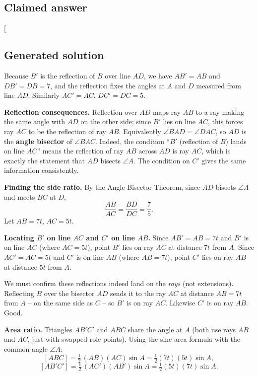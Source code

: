 \documentclass[
  11pt,
  letterpaper,
]{article}
\begin{document}
\subsection{Claimed answer}\label{claimed-answer-15}

{[}\boxed{649}{]}

\subsection{Generated solution}\label{generated-solution-15}

Because \(B'\) is the reflection of \(B\) over line \(AD\), we have
\(AB' = AB\) and \(DB' = DB = 7\), and the reflection fixes the angles
at \(A\) and \(D\) measured from line \(AD\). Similarly \(AC' = AC\),
\(DC' = DC = 5\).

\textbf{Reflection consequences.} Reflection over \(AD\) maps ray \(AB\)
to a ray making the same angle with \(AD\) on the other side; since
\(B'\) lies on line \(AC\), this forces ray \(AC\) to be the reflection
of ray \(AB\). Equivalently \(\angle BAD = \angle DAC\), so \(AD\) is
the \textbf{angle bisector} of \(\angle BAC\). Indeed, the condition
``\(B'\) (reflection of \(B\)) lands on line \(AC\)'' means the
reflection of ray \(AB\) across \(AD\) is ray \(AC\), which is exactly
the statement that \(AD\) bisects \(\angle A\). The condition on \(C'\)
gives the same information consistently.

\textbf{Finding the side ratio.} By the Angle Bisector Theorem, since
\(AD\) bisects \(\angle A\) and meets \(BC\) at \(D\),
\[\frac{AB}{AC} = \frac{BD}{DC} = \frac{7}{5}.\] Let \(AB = 7t\),
\(AC = 5t\).

\textbf{Locating \(B'\) on line \(AC\) and \(C'\) on line \(AB\).} Since
\(AB' = AB = 7t\) and \(B'\) is on line \(AC\) (where \(AC = 5t\)),
point \(B'\) lies on ray \(AC\) at distance \(7t\) from \(A\). Since
\(AC' = AC = 5t\) and \(C'\) is on line \(AB\) (where \(AB = 7t\)),
point \(C'\) lies on ray \(AB\) at distance \(5t\) from \(A\).

We must confirm these reflections indeed land on the \emph{rays} (not
extensions). Reflecting \(B\) over the bisector \(AD\) sends it to the
ray \(AC\) at distance \(AB=7t\) from \(A\) -- on the same side as \(C\)
-- so \(B'\) is on ray \(AC\). Likewise \(C'\) is on ray \(AB\). Good.

\textbf{Area ratio.} Triangles \(AB'C'\) and \(ABC\) share the angle at
\(A\) (both use rays \(AB\) and \(AC\), just with swapped role points).
Using the sine area formula with the common angle \(\angle A\): \[
[ABC] = \tfrac12\,(AB)(AC)\sin A = \tfrac12 (7t)(5t)\sin A,
\] \[
[AB'C'] = \tfrac12\,(AC')(AB')\sin A = \tfrac12 (5t)(7t)\sin A.
\]
\end{document}
